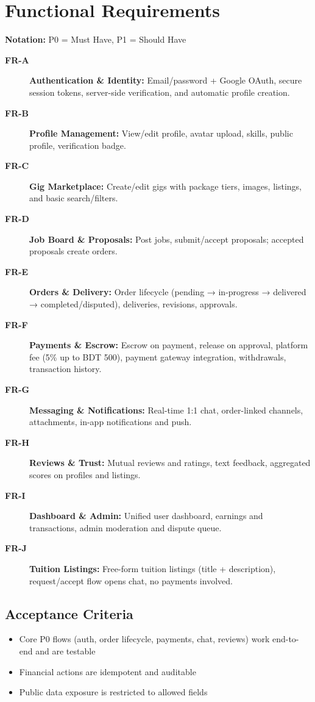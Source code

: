 \documentclass[a4paper,12pt]{article}
\begin{document}
\section{Functional Requirements}

\textbf{Notation:} P0 = Must Have, P1 = Should Have

\begin{description}
    \item[\textbf{FR-A}] \textbf{Authentication \& Identity:} Email/password + Google OAuth, secure session tokens, server-side verification, and automatic profile creation.
    \item[\textbf{FR-B}] \textbf{Profile Management:} View/edit profile, avatar upload, skills, public profile, verification badge.
    \item[\textbf{FR-C}] \textbf{Gig Marketplace:} Create/edit gigs with package tiers, images, listings, and basic search/filters.
    \item[\textbf{FR-D}] \textbf{Job Board \& Proposals:} Post jobs, submit/accept proposals; accepted proposals create orders.
    \item[\textbf{FR-E}] \textbf{Orders \& Delivery:} Order lifecycle (pending → in-progress → delivered → completed/disputed), deliveries, revisions, approvals.
    \item[\textbf{FR-F}] \textbf{Payments \& Escrow:} Escrow on payment, release on approval, platform fee (5\% up to BDT 500), payment gateway integration, withdrawals, transaction history.
    \item[\textbf{FR-G}] \textbf{Messaging \& Notifications:} Real-time 1:1 chat, order-linked channels, attachments, in-app notifications and push.
    \item[\textbf{FR-H}] \textbf{Reviews \& Trust:} Mutual reviews and ratings, text feedback, aggregated scores on profiles and listings.
    \item[\textbf{FR-I}] \textbf{Dashboard \& Admin:} Unified user dashboard, earnings and transactions, admin moderation and dispute queue.
    \item[\textbf{FR-J}] \textbf{Tuition Listings:} Free-form tuition listings (title + description), request/accept flow opens chat, no payments involved.
\end{description}

\subsection{Acceptance Criteria}
\begin{itemize}
    \item Core P0 flows (auth, order lifecycle, payments, chat, reviews) work end-to-end and are testable
    \item Financial actions are idempotent and auditable
    \item Public data exposure is restricted to allowed fields
\end{itemize}
\end{document}

